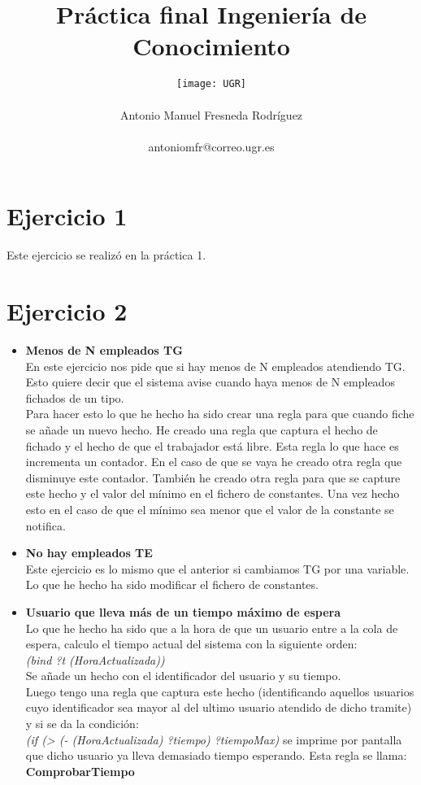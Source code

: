 \documentclass[10pt,spanish]{article}
\author{
	\texttt{[image: UGR]} \\\\
	\Large 	Antonio Manuel Fresneda Rodríguez\\
	\\antoniomfr@correo.ugr.es
	\\
}
\date{}
\title{\huge \textbf{Práctica final Ingeniería de Conocimiento}}
\begin{document}
	\maketitle
	\pagebreak
	\tableofcontents
	\pagebreak
	\section{Ejercicio 1}
	Este ejercicio se realizó en la práctica 1.
	\section{Ejercicio 2}
	\begin{itemize}
		\item \textbf{Menos de N empleados TG}\\
		En este ejercicio nos pide que si hay menos de N empleados atendiendo TG. Esto quiere decir que el sistema avise cuando haya menos de N empleados fichados de un tipo. \\
		Para hacer esto lo que he hecho ha sido crear una regla para que cuando fiche se añade un nuevo hecho. He creado una regla que captura el hecho de fichado y el hecho de que el
		trabajador está libre. Esta regla lo que hace es incrementa un contador. En el caso de que se vaya he creado otra regla que disminuye este contador. También he creado otra regla para que se capture este hecho y el valor del mínimo en el fichero de constantes. Una vez hecho esto en el caso de que el mínimo sea menor que el valor de la constante
		se notifica.
		\item \textbf{No hay empleados TE}\\
		Este ejercicio es lo mismo que el anterior si cambiamos TG por una variable. Lo que he hecho ha sido modificar el fichero de constantes.
		\item \textbf{Usuario que lleva más de un tiempo máximo de espera}\\
		Lo que he hecho ha sido que a la hora de que un usuario entre a la cola de espera, calculo el tiempo actual del sistema con la siguiente orden:\\ \textit{(bind ?t (HoraActualizada))
		}\\
		Se añade un hecho con el identificador del usuario y su tiempo. \\
		Luego tengo una regla que captura este hecho  (identificando aquellos usuarios cuyo identificador sea mayor al del ultimo usuario atendido de dicho tramite) y si se da la condición:\\ \textit{(if (> (- (HoraActualizada) ?tiempo) ?tiempoMax)} se imprime por pantalla que dicho usuario ya lleva demasiado tiempo esperando. Esta regla se llama: \textbf{ComprobarTiempo}

\end{itemize}
\end{document}
